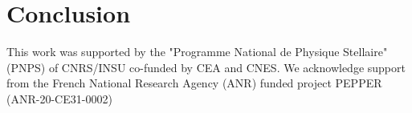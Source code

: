 \documentclass{aa}
\begin{document}
\section{Conclusion}

\begin{acknowledgements}
    This work was supported by the "Programme National de Physique Stellaire" (PNPS) of CNRS/INSU co-funded by CEA and CNES.
    We acknowledge support from the French National Research Agency (ANR)
    funded project PEPPER (ANR-20-CE31-0002)
    \end{acknowledgements}
    
    
    
    
\end{document}
